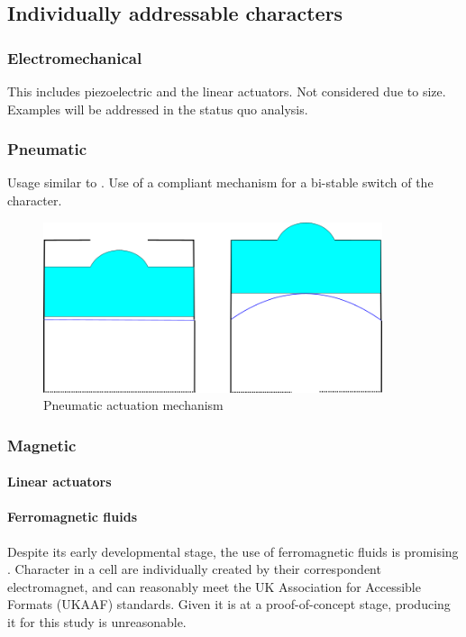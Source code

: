     \subsection{Individually addressable characters}
    \subsubsection{Electromechanical}
    This includes piezoelectric and the linear actuators. Not considered due to size. Examples will be addressed in the status quo analysis.

    \subsubsection{Pneumatic}
    Usage similar to \cite{XieZhixin2021A2rB}. Use of a compliant mechanism for a bi-stable switch of the character.  
    \begin{figure}[h]
    \centering
        \includegraphics[height=5cm]{figures/pneumatic.png}
    \caption{Pneumatic actuation mechanism}
    \label{fig:pneumatic.png}
    \end{figure}

    \subsubsection{Magnetic}
    \paragraph{Linear actuators} %

    \paragraph{Ferromagnetic fluids}
    Despite its early developmental stage, the use of ferromagnetic fluids is promising \cite{fletcher_magnetic_2021}.
    Character in a cell are individually created by their correspondent electromagnet, and can reasonably meet the UK Association for Accessible Formats (UKAAF) standards.
    Given it is at a proof-of-concept stage, producing it for this study is unreasonable.

